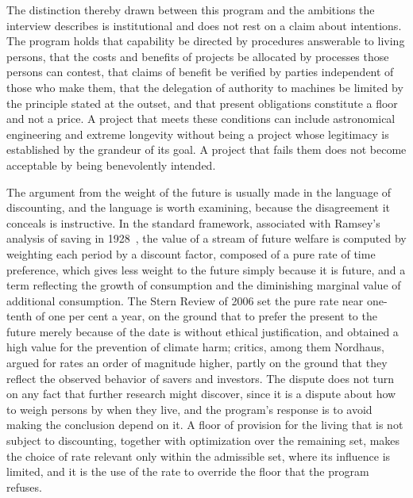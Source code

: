 The distinction thereby drawn between this program and the ambitions the interview describes is institutional and does not rest on a claim about intentions. The program holds that capability be directed by procedures answerable to living persons, that the costs and benefits of projects be allocated by processes those persons can contest, that claims of benefit be verified by parties independent of those who make them, that the delegation of authority to machines be limited by the principle stated at the outset, and that present obligations constitute a floor and not a price. A project that meets these conditions can include astronomical engineering and extreme longevity without being a project whose legitimacy is established by the grandeur of its goal. A project that fails them does not become acceptable by being benevolently intended.

The argument from the weight of the future is usually made in the language of discounting, and the language is worth examining, because the disagreement it conceals is instructive. In the standard framework, associated with Ramsey's analysis of saving in 1928~\cite{ramsey1928}, the value of a stream of future welfare is computed by weighting each period by a discount factor, composed of a pure rate of time preference, which gives less weight to the future simply because it is future, and a term reflecting the growth of consumption and the diminishing marginal value of additional consumption. The Stern Review of 2006 set the pure rate near one-tenth of one per cent a year, on the ground that to prefer the present to the future merely because of the date is without ethical justification, and obtained a high value for the prevention of climate harm; critics, among them Nordhaus, argued for rates an order of magnitude higher, partly on the ground that they reflect the observed behavior of savers and investors. The dispute does not turn on any fact that further research might discover, since it is a dispute about how to weigh persons by when they live, and the program's response is to avoid making the conclusion depend on it. A floor of provision for the living that is not subject to discounting, together with optimization over the remaining set, makes the choice of rate relevant only within the admissible set, where its influence is limited, and it is the use of the rate to override the floor that the program refuses.

